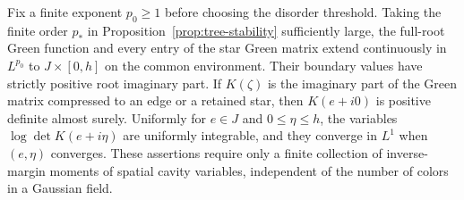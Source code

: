 \begin{lemma}
\label{lem:tree-log}
Fix a finite exponent $p_0\ge1$ before choosing the disorder threshold.
Taking the finite order $p_*$ in
Proposition~\ref{prop:tree-stability} sufficiently large, the full-root
Green function and every entry of the star Green matrix extend
continuously in $L^{p_0}$ to $J\times[0,h]$ on the common environment.
Their boundary values have strictly positive
root imaginary part.  If $K(\zeta)$ is the imaginary part of the
Green matrix compressed to an edge or a retained star, then
$K(e+i0)$ is positive definite almost surely.  Uniformly for
$e\in J$ and $0\le\eta\le h$, the variables
$\log\det K(e+i\eta)$ are uniformly integrable, and they converge
in $L^1$ when $(e,\eta)$ converges.  These assertions require only
a finite collection of inverse-margin moments of spatial cavity
variables, independent of the number of colors in a Gaussian field.
\end{lemma}


